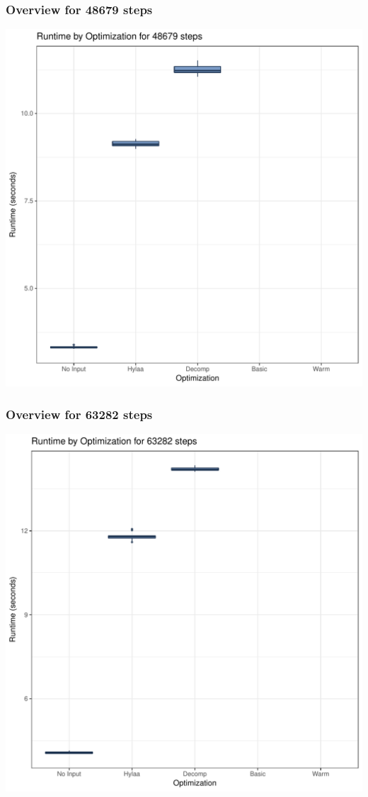 \documentclass{article}\usepackage[]{graphicx}\usepackage[]{color}
\makeatletter
\def\maxwidth{ %
  \ifdim\Gin@nat@width>\linewidth
    \linewidth
  \else
    \Gin@nat@width
  \fi
}
\newenvironment{knitrout}{}{} %
\makeatother
\begin{document}
\subsubsection{Overview for 48679 steps}
\begin{knitrout}
\color{fgcolor}
\includegraphics[width=\maxwidth]{figure/steps48679-1} 

\end{knitrout}
\subsubsection{Overview for 63282 steps}
\begin{knitrout}
\color{fgcolor}
\includegraphics[width=\maxwidth]{figure/steps63282-1} 

\end{knitrout}
\end{document}
